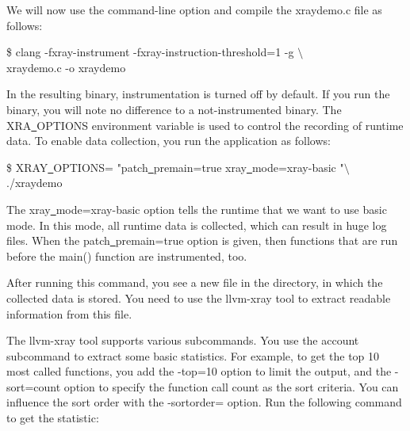 We will now use the command-line option and compile the xraydemo.c file as follows:\par

\begin{tcolorbox}[colback=white,colframe=black]
\$ clang -fxray-instrument -fxray-instruction-threshold=1 -g $\setminus$ \\
\hspace*{1cm}xraydemo.c -o xraydemo
\end{tcolorbox}

In the resulting binary, instrumentation is turned off by default. If you run the binary, you will note no difference to a not-instrumented binary. The XRA\underline{~}OPTIONS environment variable is used to control the recording of runtime data. To enable data collection, you run the application as follows:\par

\begin{tcolorbox}[colback=white,colframe=black]
\$ XRAY\underline{~}OPTIONS= "patch\underline{~}premain=true xray\underline{~}mode=xray-basic "$\setminus$ \\
./xraydemo
\end{tcolorbox}

The xray\underline{~}mode=xray-basic option tells the runtime that we want to use basic mode. In this mode, all runtime data is collected, which can result in huge log files. When the patch\underline{~}premain=true option is given, then functions that are run before the main() function are instrumented, too.\par

After running this command, you see a new file in the directory, in which the collected data is stored. You need to use the llvm-xray tool to extract readable information from this file.\par

The llvm-xray tool supports various subcommands. You use the account
subcommand to extract some basic statistics. For example, to get the top 10 most called functions, you add the -top=10 option to limit the output, and the -sort=count option to specify the function call count as the sort criteria. You can influence the sort order with the -sortorder= option. Run the following command to get the statistic:\par


